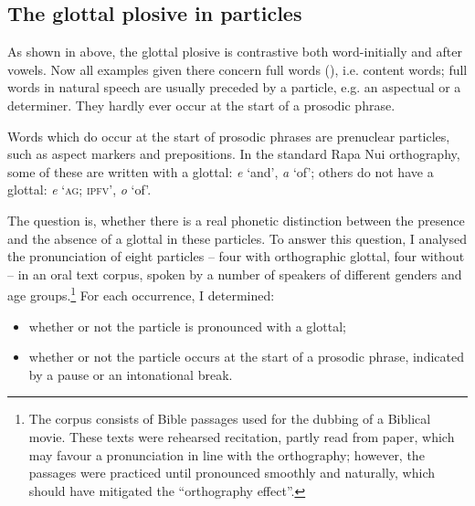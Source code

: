 \subsection{The glottal plosive in particles}\label{sec:2.2.5}
\largerpage
{}
As shown in  above, the glottal plosive is contrastive both word-initially and after vowels. Now all examples given there concern full words (), i.e. content words; full words in natural speech are usually preceded by a particle, e.g. an aspectual or a determiner. They hardly ever occur at the start of a prosodic phrase. 

Words which do occur at the start of prosodic phrases are prenuclear particles, such as aspect markers and prepositions. In the standard Rapa Nui orthography, some of these are written with a glottal: \textit{{\ꞌ}e} ‘and’, \textit{{\ꞌ}a} ‘of’; others do not have a glottal: \textit{e} ‘\textsc{ag}; \textsc{ipfv}’, \textit{o} ‘of’. 

The question is, whether there is a real phonetic distinction between the presence and the absence of a glottal in these particles. To answer this question, I analysed the pronunciation of eight particles – four with orthographic glottal, four without – in an oral text corpus, spoken by a number of speakers of different genders and age groups.\footnote{\label{fn:36}The corpus consists of Bible passages used for the dubbing of a Biblical movie. These texts were rehearsed recitation, partly read from paper, which may favour a pronunciation in line with the orthography; however, the passages were practiced until pronounced smoothly and naturally, which should have mitigated the “orthography effect”.}  For each occurrence, I determined:

\begin{itemize}
\item 
whether or not the particle is pronounced with a glottal;

\item 
whether or not the particle occurs at the start of a prosodic phrase, indicated by a pause or an intonational break.

\end{itemize}

